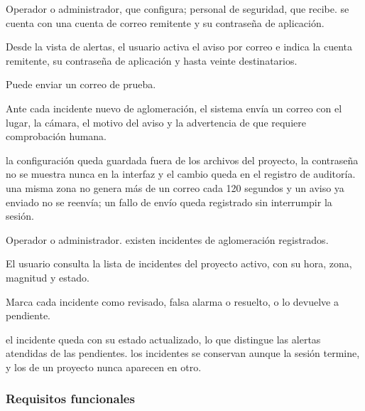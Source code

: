   {Operador o administrador, que configura; personal de seguridad, que recibe.}
  {se cuenta con una cuenta de correo remitente y su contraseña de aplicación.}
  {\item Desde la vista de alertas, el usuario activa el aviso por correo e indica la cuenta
         remitente, su contraseña de aplicación y hasta veinte destinatarios.
   \item Puede enviar un correo de prueba.
   \item Ante cada incidente nuevo de aglomeración, el sistema envía un correo con el lugar, la
         cámara, el motivo del aviso y la advertencia de que requiere comprobación humana.}
  {la configuración queda guardada fuera de los archivos del proyecto, la contraseña no se
   muestra nunca en la interfaz y el cambio queda en el registro de auditoría.}
  {una misma zona no genera más de un correo cada 120 segundos y un aviso ya enviado no se
   reenvía; un fallo de envío queda registrado sin interrumpir la sesión.}

  {Operador o administrador.}
  {existen incidentes de aglomeración registrados.}
  {\item El usuario consulta la lista de incidentes del proyecto activo, con su hora, zona,
         magnitud y estado.
   \item Marca cada incidente como revisado, falsa alarma o resuelto, o lo devuelve a
         pendiente.}
  {el incidente queda con su estado actualizado, lo que distingue las alertas atendidas de las
   pendientes.}
  {los incidentes se conservan aunque la sesión termine, y los de un proyecto nunca aparecen
   en otro.}

\subsubsection{Requisitos funcionales}
\label{subsec:rf-tabla}

